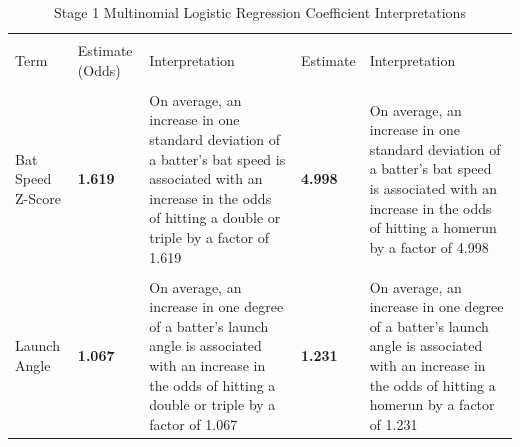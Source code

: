 \documentclass[
  letterpaper,
  DIV=11,
  numbers=noendperiod]{scrartcl}
\begin{document}
\begin{table}[!h]
\centering
\caption{\label{tab:unnamed-chunk-34}Stage 1 Multinomial Logistic Regression Coefficient Interpretations}
\centering
\fontsize{10}{12}\selectfont
\begin{tabular}[t]{>{\raggedright\arraybackslash}p{3cm}>{\raggedright\arraybackslash}p{2cm}>{\raggedright\arraybackslash}p{4cm}>{\raggedright\arraybackslash}p{2cm}>{\raggedright\arraybackslash}p{4cm}}
\toprule
\multicolumn{1}{c}{ } & \multicolumn{2}{c}{Double/Triple} & \multicolumn{2}{c}{Homerun} \\
\cmidrule(l{3pt}r{3pt}){2-3} \cmidrule(l{3pt}r{3pt}){4-5}
Term & Estimate (Odds) & Interpretation & Estimate  & Interpretation \\
\midrule
\cellcolor{gray!10}{Swing Length Z-Score} & \textbf{\cellcolor{gray!10}{1.171}} & \cellcolor{gray!10}{On average, an increase in one standard deviation of a batter's swing length is associated with an increase in the odds of hitting a double or triple by a factor of 1.171.} & \textbf{\cellcolor{gray!10}{1.483}} & \cellcolor{gray!10}{On average, an increase in one standard deviation of a batter's swing length is associated with an increase in the odds of hitting a homerun by a factor of 1.483}\\
Bat Speed Z-Score & \textbf{1.619} & On average, an increase in one standard deviation of a batter's bat speed is associated with an increase in the odds of hitting a double or triple by a factor of 1.619 & \textbf{4.998} & On average, an increase in one standard deviation of a batter's bat speed is associated with an increase in the odds of hitting a homerun by a factor of 4.998\\
\cellcolor{gray!10}{Release Speed Z-Score} & \cellcolor{gray!10}{0.99} & \cellcolor{gray!10}{On average, an increase in one standard deviation of a pitcher's release speed is associated with an increase in the odds of hitting a double or triple by a factor of 0.99} & \textbf{\cellcolor{gray!10}{1.090}} & \cellcolor{gray!10}{On average, an increase in one standard deviation of a pitcher's release speed is associated with an increase in the odds of hitting a homerun by a factor of 1.090}\\
Launch Angle & \textbf{1.067} & On average, an increase in one degree of a batter's launch angle is associated with an increase in the odds of hitting a double or triple by a factor of 1.067 & \textbf{1.231} & On average, an increase in one degree of a batter's launch angle is associated with an increase in the odds of hitting a homerun by a factor of 1.231\\

\end{tabular}
\end{table}
\end{document}
